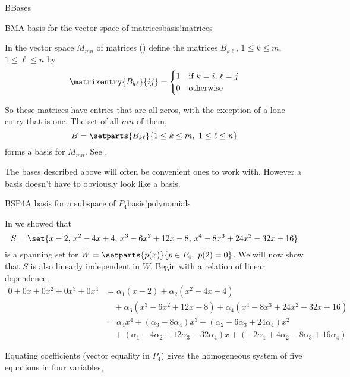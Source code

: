 \begin{subsect}{B}{Bases}
\begin{example}{BM}{A basis for the vector space of matrices}{basis!matrices}
\begin{para}In the vector space $M_{mn}$ of matrices ()  define the matrices $B_{k\ell}$, $1\leq k\leq m$, $1\leq\ell\leq n$ by
%
\begin{equation*}
\matrixentry{B_{k\ell}}{ij}=\begin{cases}
1&\text{if }k=i,\,\ell=j\\
0&\text{otherwise}
\end{cases}
\end{equation*}
\end{para}
%
\begin{para}So these matrices have entries that are all zeros, with the exception of a lone entry that is one.  The set of all $mn$ of them,
%
\begin{equation*}
B=\setparts{B_{k\ell}}{1\leq k\leq m,\ 1\leq\ell\leq n}
\end{equation*}
%
forms a basis for $M_{mn}$.  See .
\end{para}
\end{example}
%
\begin{para}The bases described above will often be convenient ones to work with.  However a basis doesn't have to obviously look like a basis.\end{para}
%
\begin{example}{BSP4}{A basis for a subspace of $P_4$}{basis!polynomials}
\begin{para}In  we showed that
%
\begin{equation*}
S=\set{x-2,\,x^2-4x+4,\,x^3-6x^2+12x-8,\,x^4-8x^3+24x^2-32x+16}
\end{equation*}
%
is a spanning set for $W=\setparts{p(x)}{p\in P_4,\ p(2)=0}$.  We will now show that $S$ is also linearly independent in $W$.  Begin with a relation of linear dependence,
%
\begin{align*}
0+0x+0x^2+0x^3+0x^4
&=\alpha_1\left(x-2\right)+\alpha_2\left(x^2-4x+4\right)\\
&\quad +\alpha_3\left(x^3-6x^2+12x-8\right)+\alpha_4\left(x^4-8x^3+24x^2-32x+16\right)\\
%
&=\alpha_4x^4+
\left(\alpha_3-8\alpha_4\right)x^3+
\left(\alpha_2-6\alpha_3+24\alpha_4\right)x^2\\
&\quad +
\left(\alpha_1-4\alpha_2+12\alpha_3-32\alpha_4\right)x+
\left(-2\alpha_1+4\alpha_2-8\alpha_3+16\alpha_4\right)
\end{align*}
\end{para}
%
\begin{para}Equating coefficients (vector equality in $P_4$) gives the homogeneous system of five equations in four variables,

\end{para}
\end{example}
\end{subsect}
